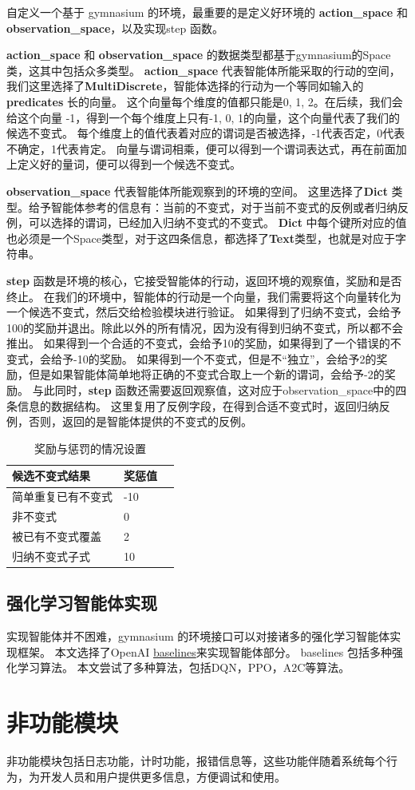自定义一个基于 gymnasium 的环境，最重要的是定义好环境的 \textbf{action\_space} 和 \textbf{observation\_space}，以及实现step 函数。

\textbf{action\_space} 和 \textbf{observation\_space} 的数据类型都基于gymnasium的Space类，这其中包括众多类型。
\textbf{action\_space} 代表智能体所能采取的行动的空间，我们这里选择了\textbf{MultiDiscrete}，智能体选择的行动为一个等同如输入的 \textbf{predicates} 长的向量。
这个向量每个维度的值都只能是0, 1, 2。在后续，我们会给这个向量 -1，得到一个每个维度上只有-1, 0, 1的向量，这个向量代表了我们的候选不变式。
每个维度上的值代表着对应的谓词是否被选择，-1代表否定，0代表不确定，1代表肯定。
向量与谓词相乘，便可以得到一个谓词表达式，再在前面加上定义好的量词，便可以得到一个候选不变式。

\textbf{observation\_space} 代表智能体所能观察到的环境的空间。
这里选择了\textbf{Dict} 类型。给予智能体参考的信息有：当前的不变式，对于当前不变式的反例或者归纳反例，可以选择的谓词，已经加入归纳不变式的不变式。
\textbf{Dict} 中每个键所对应的值也必须是一个Space类型，对于这四条信息，都选择了\textbf{Text}类型，也就是对应于字符串。

\textbf{step} 函数是环境的核心，它接受智能体的行动，返回环境的观察值，奖励和是否终止。
在我们的环境中，智能体的行动是一个向量，我们需要将这个向量转化为一个候选不变式，然后交给检验模块进行验证。
如果得到了归纳不变式，会给予100的奖励并退出。除此以外的所有情况，因为没有得到归纳不变式，所以都不会推出。
如果得到一个合适的不变式，会给予10的奖励，如果得到了一个错误的不变式，会给予-10的奖励。
如果得到一个不变式，但是不“独立”，会给予2的奖励，但是如果智能体简单地将正确的不变式合取上一个新的谓词，会给予-2的奖励。
与此同时，\textbf{step} 函数还需要返回观察值，这对应于observation\_space中的四条信息的数据结构。
这里复用了反例字段，在得到合适不变式时，返回归纳反例，否则，返回的是智能体提供的不变式的反例。
\begin{table}[!h]
    \label{table:award_punish}
	\centering
	\caption{奖励与惩罚的情况设置}
	\label{tab::situation}
	\renewcommand\arraystretch{1.4}
	\begin{tabular}{p{}p{}p{}}
		\toprule
		\textbf{候选不变式结果}   & \textbf{奖惩值} \\ 
        \midrule
		简单重复已有不变式 & -10 \\
		非不变式      & 0   \\
		被已有不变式覆盖  & 2   \\
		归纳不变式子式   & 10 \\
        \bottomrule
	\end{tabular}
\end{table}

\subsection{强化学习智能体实现}

实现智能体并不困难，gymnasium 的环境接口可以对接诸多的强化学习智能体实现框架。
本文选择了OpenAI \href{https://github.com/openai/baselines}{baselines}\cite{baselines}来实现智能体部分。
baselines 包括多种强化学习算法。
本文尝试了多种算法，包括DQN，PPO，A2C等算法。

\section{非功能模块}

非功能模块包括日志功能，计时功能，报错信息等，这些功能伴随着系统每个行为，为开发人员和用户提供更多信息，方便调试和使用。